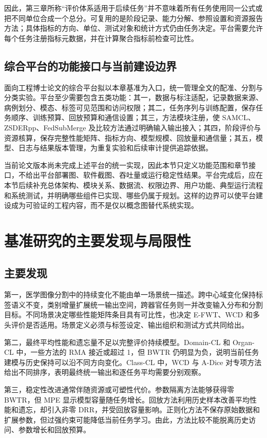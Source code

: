 因此，第三章所称“评价体系适用于后续任务”并不意味着所有任务使用同一公式或把不同单位合成一个总分。可复用的是阶段记录、能力分解、参照设置和资源报告方法；具体指标的方向、单位、测试对象和统计方式仍由任务决定。平台需要允许每个任务注册指标元数据，并在计算聚合指标前检查可比性。

\subsection{综合平台的功能接口与当前建设边界}

面向工程博士论文的综合平台拟以本章基准为入口，统一管理全文的配准、分割与分类实验。平台至少需要包含五类功能：其一，数据与标注适配，记录数据来源、病例划分、模态、标签可见范围和访问权限；其二，任务序列与训练配置，保存任务顺序、训练预算、回放预算和通信设置；其三，方法模块注册，使 SAMCL、ZSDERpp、FedSubMerge 及比较方法通过明确输入输出接入；其四，阶段评价与资源核算，保存完整性能矩阵、指标方向、模型规模、回放量和通信量；其五，模型、日志与结果版本管理，为重复实验和后续审计提供追踪依据。

当前论文版本尚未完成上述平台的统一实现，因此本节只定义功能范围和章节接口，不给出平台部署图、软件截图、吞吐量或运行稳定性结果。平台完成后，应在本节后续补充总体架构、模块关系、数据流、权限边界、用户功能、典型运行流程和系统测试，并明确哪些组件已实现、哪些仍属于规划。这样的边界可以使平台建设成为可验证的工程内容，而不是仅以概念图替代系统实现。

\section{基准研究的主要发现与局限性}
\label{sec:benchmark-findings-limitations}

\subsection*{主要发现}

第一，医学图像分割中的持续变化不能由单一场景统一描述。跨中心域变化保持标签语义不变，类别增量扩展统一输出空间，跨器官任务则一并改变输入分布和分割目标。不同场景决定哪些性能矩阵条目具有可比性，也决定 E-FWT、WCD 和多头评价是否适用。场景定义必须与标签设定、输出组织和测试方式共同给出。

第二，最终平均性能和遗忘量不足以完整评价持续模型。Domain-CL 和 Organ-CL 中，一些方法的 RMA 接近或超过 1，但 BWTR 仍明显为负，说明当前任务建模与历史保持可以沿不同方向变化。Class-CL 中，WCD 与 A-Dice 对专项方法给出不同排序，表明最终统一输出和逐任务平均需要分别观察。

第三，稳定性改进通常伴随资源或可塑性代价。参数隔离方法能够获得零 BWTR，但 MPE 显示模型容量随任务增长。回放方法利用历史样本改善平均性能和遗忘，却引入非零 DRR，并受回放容量影响。正则化方法不保存原始数据和扩展参数，但过强约束可能降低当前任务学习。由此，方法比较不能脱离历史访问、参数增长和回放预算。

